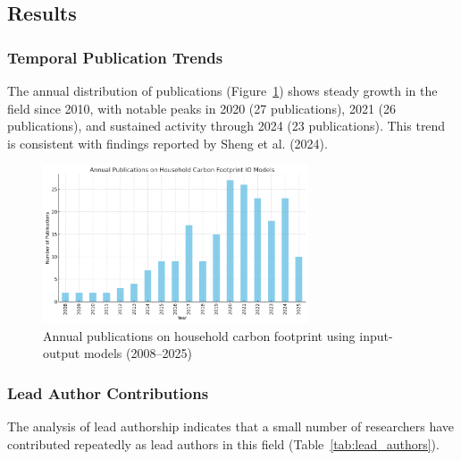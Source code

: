 \documentclass[12pt,a4paper]{article}%
\begin{document}
\subsection{Results}

\subsubsection{Temporal Publication Trends}

The annual distribution of publications (Figure~\ref{fig:Publications}) shows steady growth in the field since 2010, with notable peaks in 2020 (27 publications), 2021 (26 publications), and sustained activity through 2024 (23 publications). This trend is consistent with findings reported by Sheng et al. (2024).

\begin{figure}[h]
\centering
\includegraphics[width=0.7\textwidth]{Publications.png}
\caption{Annual publications on household carbon footprint using input-output models (2008--2025)}
\label{fig:Publications}
\end{figure}

\subsubsection{Lead Author Contributions}

The analysis of lead authorship indicates that a small number of researchers have contributed repeatedly as lead authors in this field (Table~\ref{tab:lead_authors}). 
\end{document}
